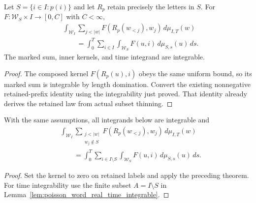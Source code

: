 \begin{theorem}
\label{thm:poisson_word_real_partition_prefix}
\leanok
{}
Let $S=\{i\in I:p(i)\}$ and let $R_p$ retain precisely the letters in $S$.
For $F:\mathcal W_S\times I\to[0,C]$ with $C<\infty$,
\begin{equation}
\label{eq:poisson_word_real_partition_prefix}
\begin{aligned}
 &\int_{\mathcal W_I}\sum_{j<|w|}F(R_p(w_{<j}),w_j)\,d\mu_{I,T}(w)\\
 &\qquad=\int_0^T\sum_{i\in I}\int_{\mathcal W_S}
 F(u,i)\,d\mu_{S,s}(u)\,ds.
\end{aligned}
\end{equation}
The marked sum, inner kernels, and time integrand are integrable.
\end{theorem}
\begin{proof}
\leanok
{}
The composed kernel $F(R_p(u),i)$ obeys the same uniform bound, so its
marked sum is integrable by length domination.  Convert the existing
nonnegative retained-prefix identity using the integrability just proved.
That identity already derives the retained law from actual subset thinning.
\end{proof}

\begin{corollary}
\label{cor:poisson_word_real_omitted_prefix}
\leanok
{}
With the same assumptions, all integrands below are integrable and
\begin{equation}
\label{eq:poisson_word_real_omitted_prefix}
\begin{aligned}
 &\int_{\mathcal W_I}\sum_{\substack{j<|w|\\w_j\notin S}}
 F(R_p(w_{<j}),w_j)\,d\mu_{I,T}(w)\\
 &\qquad=\int_0^T\sum_{i\in I\setminus S}\int_{\mathcal W_S}
 F(u,i)\,d\mu_{S,s}(u)\,ds.
\end{aligned}
\end{equation}
\end{corollary}
\begin{proof}
\leanok
Set the kernel to zero on retained labels and apply the preceding theorem.
For time integrability use the finite subset $A=I\setminus S$ in
Lemma~\ref{lem:poisson_word_real_time_integrable}.
\end{proof}

